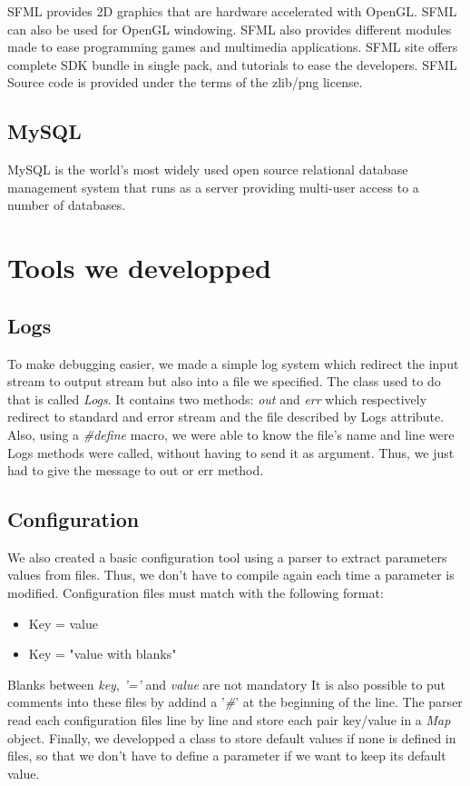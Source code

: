 \documentclass{scrreprt}
\begin{document}
		  SFML provides 2D graphics that are hardware accelerated with OpenGL. SFML can also be used for OpenGL windowing. SFML also provides different modules made to ease programming games and multimedia applications. SFML site offers complete SDK bundle in single pack, and tutorials to ease the developers. SFML Source code is provided under the terms of the zlib/png license.

		  \subsection{MySQL}
		  MySQL is the world's most widely used open source relational database management system that runs as a server providing multi-user access to a number of databases.
		  \section{Tools we developped} 
		  \subsection{Logs}
		  To make debugging easier, we made a simple log system which redirect the input stream to output stream but also into a file we specified. The class used to do that is called \emph{Logs}. It contains two methods: \emph{out} and \emph{err} which respectively redirect to standard and error stream and the file described by Logs attribute. Also, using a \emph{\#define} macro, we were able to know the file's name and line were Logs methods were called, without having to send it as argument. Thus, we just had to give the message to out or err method.
		  \subsection{Configuration}
		  We also created a basic configuration tool using a parser to extract parameters values from files. Thus, we don't have to compile again each time a parameter is modified. Configuration files must match with the following format:
		  \begin{itemize}
		  \item{Key = value}
		  \item{Key = "value with blanks"}
		  \end{itemize}
		
		  Blanks between \emph{key}, \emph{'='} and \emph{value} are not mandatory
		  It is also possible to put comments into these files by addind a '\emph{\#}' at the beginning of the line. The parser read each configuration files line by line and store each pair key/value in a \emph{Map} object. Finally, we developped a class to store default values if none is defined in files, so that we don't have to define a parameter if we want to keep its default value.
\end{document}
